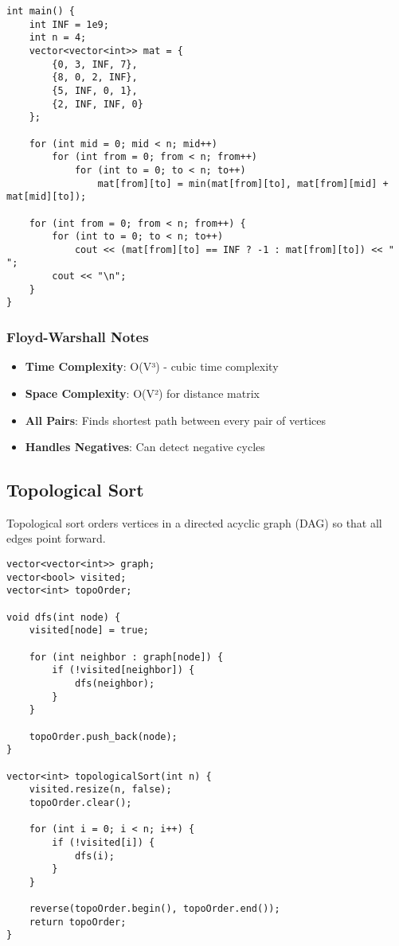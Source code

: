 \documentclass[11pt,a4paper]{article}
\begin{document}
\begin{lstlisting}[caption={Floyd-Warshall Algorithm}]
int main() {
    int INF = 1e9;
    int n = 4;
    vector<vector<int>> mat = {
        {0, 3, INF, 7},
        {8, 0, 2, INF},
        {5, INF, 0, 1},
        {2, INF, INF, 0}
    };

    for (int mid = 0; mid < n; mid++)
        for (int from = 0; from < n; from++)
            for (int to = 0; to < n; to++)
                mat[from][to] = min(mat[from][to], mat[from][mid] + mat[mid][to]);

    for (int from = 0; from < n; from++) {
        for (int to = 0; to < n; to++)
            cout << (mat[from][to] == INF ? -1 : mat[from][to]) << " ";
        cout << "\n";
    }
}
\end{lstlisting}

\subsubsection*{Floyd-Warshall Notes}
\begin{itemize}
\item \textbf{Time Complexity}: O(V³) - cubic time complexity
\item \textbf{Space Complexity}: O(V²) for distance matrix
\item \textbf{All Pairs}: Finds shortest path between every pair of vertices
\item \textbf{Handles Negatives}: Can detect negative cycles
\end{itemize}

\newpage
\subsection{Topological Sort}
Topological sort orders vertices in a directed acyclic graph (DAG) so that all edges point forward.

\begin{lstlisting}[caption={Topological Sort with DFS}]
vector<vector<int>> graph;
vector<bool> visited;
vector<int> topoOrder;

void dfs(int node) {
    visited[node] = true;
    
    for (int neighbor : graph[node]) {
        if (!visited[neighbor]) {
            dfs(neighbor);
        }
    }
    
    topoOrder.push_back(node);
}

vector<int> topologicalSort(int n) {
    visited.resize(n, false);
    topoOrder.clear();
    
    for (int i = 0; i < n; i++) {
        if (!visited[i]) {
            dfs(i);
        }
    }
    
    reverse(topoOrder.begin(), topoOrder.end());
    return topoOrder;
}
\end{lstlisting}
\end{document}
